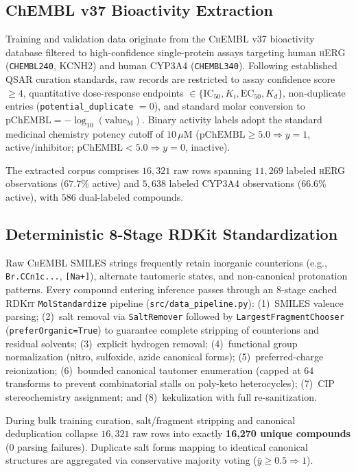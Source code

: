 \documentclass[10pt,twocolumn,letterpaper]{article}
\newcommand{\smiles}[1]{\texttt{\scriptsize #1}}
\begin{document}
\subsection{ChEMBL v37 Bioactivity Extraction}
Training and validation data originate from the \textsc{ChEMBL} v37 bioactivity database \citep{zdrazil2024chembl} filtered to high-confidence single-protein assays targeting human \textsc{hERG} (\texttt{CHEMBL240}, \textsc{KCNH2}) and human \textsc{CYP3A4} (\texttt{CHEMBL340}). Following established \textsc{QSAR} curation standards, raw records are restricted to assay confidence score $\ge 4$, quantitative dose-response endpoints $\in \{\mathrm{IC}_{50}, K_i, \mathrm{EC}_{50}, K_d\}$, non-duplicate entries (\texttt{potential\_duplicate} $= 0$), and standard molar conversion to $\mathrm{pChEMBL} = -\log_{10}(\text{value}_{\text{M}})$. Binary activity labels adopt the standard medicinal chemistry potency cutoff of $10\,\mu\mathrm{M}$ ($\mathrm{pChEMBL} \ge 5.0 \Rightarrow y = 1$, active/inhibitor; $\mathrm{pChEMBL} < 5.0 \Rightarrow y = 0$, inactive).

The extracted corpus comprises $16{,}321$ raw rows spanning $11{,}269$ labeled \textsc{hERG} observations ($67.7\%$ active) and $5{,}638$ labeled \textsc{CYP3A4} observations ($66.6\%$ active), with $586$ dual-labeled compounds.

\subsection{Deterministic 8-Stage RDKit Standardization}
Raw \textsc{ChEMBL} \textsc{SMILES} strings frequently retain inorganic counterions (e.g., \smiles{Br.CCn1c...}, \smiles{[Na+]}), alternate tautomeric states, and non-canonical protonation patterns. Every compound entering inference passes through an 8-stage cached \textsc{RDKit} \texttt{MolStandardize} pipeline (\texttt{src/data\_pipeline.py}):
(1)~\textsc{SMILES} valence parsing;
(2)~salt removal via \texttt{SaltRemover} followed by \texttt{LargestFragmentChooser} (\texttt{preferOrganic=True}) to guarantee complete stripping of counterions and residual solvents;
(3)~explicit hydrogen removal;
(4)~functional group normalization (nitro, sulfoxide, azide canonical forms);
(5)~preferred-charge reionization;
(6)~bounded canonical tautomer enumeration (capped at $64$ transforms to prevent combinatorial stalls on poly-keto heterocycles);
(7)~CIP stereochemistry assignment; and
(8)~kekulization with full re-sanitization.

During bulk training curation, salt/fragment stripping and canonical deduplication collapse $16{,}321$ raw rows into exactly \textbf{16,270 unique compounds} ($0$ parsing failures). Duplicate salt forms mapping to identical canonical structures are aggregated via conservative majority voting ($\bar{y} \ge 0.5 \Rightarrow 1$).
\end{document}
